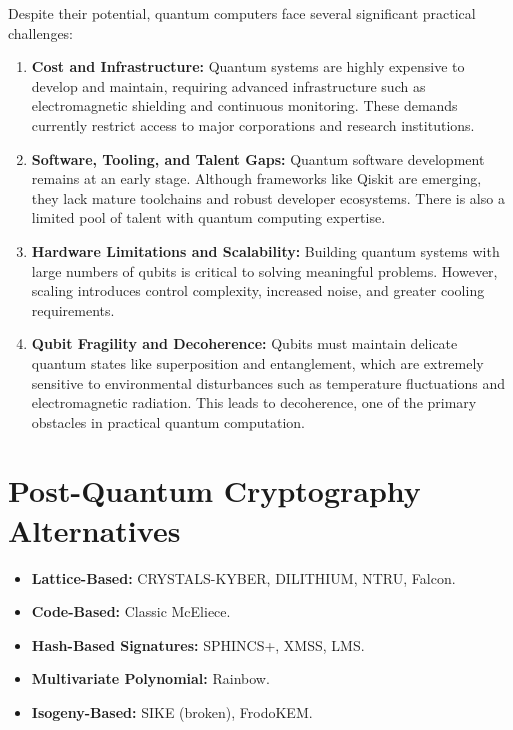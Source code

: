 \documentclass{article}
\begin{document}
\begin{errorbox}[title=Current Challenges]
    Despite their potential, quantum computers face several significant practical challenges:

    \begin{enumerate}
        \item \textbf{Cost and Infrastructure:} Quantum systems are highly expensive to develop and maintain, requiring advanced infrastructure such as electromagnetic shielding and continuous monitoring. These demands currently restrict access to major corporations and research institutions.

        \item \textbf{Software, Tooling, and Talent Gaps:} Quantum software development remains at an early stage. Although frameworks like Qiskit are emerging, they lack mature toolchains and robust developer ecosystems. There is also a limited pool of talent with quantum computing expertise.

        \item \textbf{Hardware Limitations and Scalability:} Building quantum systems with large numbers of qubits is critical to solving meaningful problems. However, scaling introduces control complexity, increased noise, and greater cooling requirements.

        \item \textbf{Qubit Fragility and Decoherence:} Qubits must maintain delicate quantum states like superposition and entanglement, which are extremely sensitive to environmental disturbances such as temperature fluctuations and electromagnetic radiation. This leads to decoherence, one of the primary obstacles in practical quantum computation.
    \end{enumerate}
\end{errorbox}

\section{Post-Quantum Cryptography Alternatives}

\begin{successbox}[title=Future-Proof Solutions]
    \begin{itemize}
        \item \textbf{Lattice-Based:} CRYSTALS-KYBER, DILITHIUM, NTRU, Falcon.
        \item \textbf{Code-Based:} Classic McEliece.
        \item \textbf{Hash-Based Signatures:} SPHINCS+, XMSS, LMS.
        \item \textbf{Multivariate Polynomial:} Rainbow.
        \item \textbf{Isogeny-Based:} SIKE (broken), FrodoKEM.
    \end{itemize}
\end{successbox}
\end{document}

